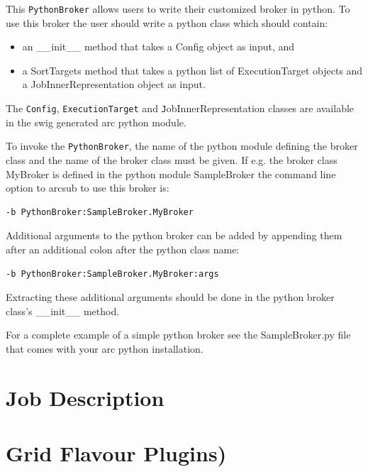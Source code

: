 \documentclass{book}
\newcommand{\Config}{\texttt{Config}}
\newcommand{\PythonBroker}{\texttt{PythonBroker}}
\newcommand{\ExecutionTarget}{\texttt{ExecutionTarget}}
\begin{document}
This {\PythonBroker} allows users to write their customized broker in
python. To use this broker the user should write a python class which
should contain:

\begin{itemize}

\item{an \_\_init\_\_ method that takes a Config object as input, and}
\item{a SortTargets method that takes a python list of ExecutionTarget
  objects and a JobInnerRepresentation object as input.}

\end{itemize}

The {\Config}, {\ExecutionTarget} and {\texttt JobInnerRepresentation} classes are
available in the swig generated arc python module.

To invoke the {\PythonBroker}, the name of the python module defining
the broker class and the name of the broker class must be given. If
e.g. the broker class MyBroker is defined in the python module
SampleBroker the command line option to arcsub to use this broker is:

\begin{shaded}
\begin{verbatim}
-b PythonBroker:SampleBroker.MyBroker
\end{verbatim}
\end{shaded}

Additional arguments to the python broker can be added by appending
them after an additional colon after the python class name:

\begin{shaded}
\begin{verbatim}
-b PythonBroker:SampleBroker.MyBroker:args
\end{verbatim}
\end{shaded}

Extracting these additional arguments should be done in the python
broker class's \_\_init\_\_ method.

For a complete example of a simple python broker see the
SampleBroker.py file that comes with your arc python installation.

\chapter{Job Description}
\label{sec:jobdesc}

\chapter{Grid Flavour Plugins)}
\label{sec:plugins}
\end{document}
